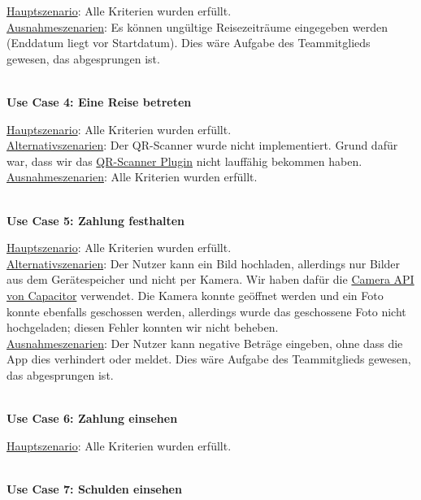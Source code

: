 \begin{addmargin}{10pt}
\underline{Hauptszenario}: Alle Kriterien wurden erfüllt.\\
\underline{Ausnahmeszenarien}: Es können ungültige Reisezeiträume eingegeben werden (Enddatum liegt vor Startdatum). Dies wäre Aufgabe des Teammitglieds gewesen, das abgesprungen ist.\\
\end{addmargin}
\\
\textbf{Use Case 4: Eine Reise betreten}\\

\begin{addmargin}{10pt}
\underline{Hauptszenario}: Alle Kriterien wurden erfüllt.\\
\underline{Alternativszenarien}: Der QR-Scanner wurde nicht implementiert. Grund dafür war, dass wir das \href{https://ionicframework.com/docs/v3/native/qr-scanner/}{QR-Scanner Plugin} nicht lauffähig bekommen haben.\\
\underline{Ausnahmeszenarien}: Alle Kriterien wurden erfüllt.\\
\end{addmargin}
\\
\textbf{Use Case 5: Zahlung festhalten}\\

\begin{addmargin}{10pt}
\underline{Hauptszenario}: Alle Kriterien wurden erfüllt.\\
\underline{Alternativszenarien}: Der Nutzer kann ein Bild hochladen, allerdings nur Bilder aus dem Gerätespeicher und nicht per Kamera. Wir haben dafür die \href{https://ionicframework.com/docs/angular/your-first-app/taking-photos}{Camera API von Capacitor} verwendet. Die Kamera konnte geöffnet werden und ein Foto konnte ebenfalls geschossen werden, allerdings wurde das geschossene Foto nicht hochgeladen; diesen Fehler konnten wir nicht beheben.\\
\underline{Ausnahmeszenarien}: Der Nutzer kann negative Beträge eingeben, ohne dass die App dies verhindert oder meldet. Dies wäre Aufgabe des Teammitglieds gewesen, das abgesprungen ist.\\
\end{addmargin}
\\
\textbf{Use Case 6: Zahlung einsehen}\\

\begin{addmargin}{10pt}
\underline{Hauptszenario}: Alle Kriterien wurden erfüllt.\\
\end{addmargin}
\\
\textbf{Use Case 7: Schulden einsehen}\\

